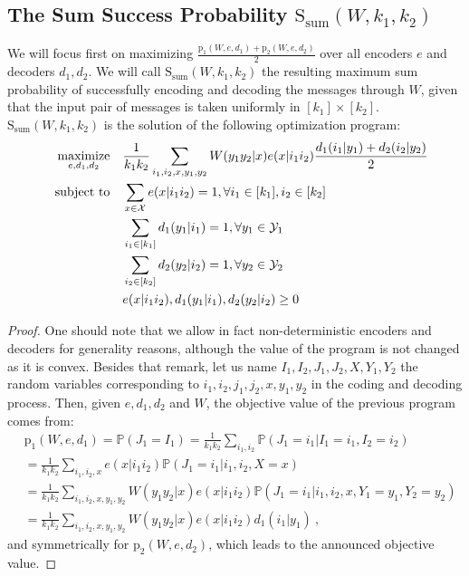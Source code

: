 \subsection{The Sum Success Probability $\mathrm{S}_{\text{sum}}(W,k_1,k_2)$}
We will focus first on maximizing $\frac{\mathrm{p}_1(W,e,d_1)+\mathrm{p}_2(W,e,d_2)}{2}$ over all encoders $e$ and decoders $d_1,d_2$. We will call $\mathrm{S}_{\text{sum}}(W,k_1,k_2)$ the resulting maximum sum probability of successfully encoding and decoding the messages through $W$, given that the input pair of messages is taken uniformly in $[k_1] \times [k_2]$. $\mathrm{S}_{\text{sum}}(W,k_1,k_2)$ is the solution of the following optimization program:
\begin{equation}
  \begin{aligned}
    &&\underset{e,d_1,d_2}{\operatorname{\text{maximize}}} &&& \frac{1}{k_1k_2}\sum_{i_1,i_2,x,y_1,y_2} W(y_1y_2|x)e(x|i_1i_2)\frac{d_1(i_1|y_1) + d_2(i_2|y_2)}{2}\\
    &&\operatorname{\text{subject to}} &&& \sum_{x \in \mathcal{X}} e(x|i_1i_2) = 1, \forall i_1 \in [k_1], i_2 \in [k_2]\\
    &&&&& \sum_{i_1 \in [k_1]} d_1(y_1|i_1) = 1, \forall y_1 \in \mathcal{Y}_1\\
    &&&&& \sum_{i_2 \in [k_2]} d_2(y_2|i_2) = 1, \forall y_2 \in \mathcal{Y}_2\\
    &&&&& e(x|i_1i_2), d_1(y_1|i_1), d_2(y_2|i_2) \geq 0
  \end{aligned}
\end{equation}

\begin{proof}
One should note that we allow in fact non-deterministic encoders and decoders for generality reasons, although the value of the program is not changed as it is convex. Besides that remark, let us name $I_1,I_2,J_1,J_2,X,Y_1,Y_2$ the random variables corresponding to $i_1,i_2,j_1,j_2,x,y_1,y_2$ in the coding and decoding process. Then, given $e,d_1,d_2$ and $W$, the objective value of the previous program comes from:
\begin{equation}
  \begin{aligned}
    &\mathrm{p}_1(W,e,d_1) = \mathbb{P}\left(J_1 = I_1\right) = \frac{1}{k_1k_2}\sum_{i_1,i_2} \mathbb{P}\left(J_1 = i_1|I_1=i_1,I_2=i_2\right)\\
    &= \frac{1}{k_1k_2}\sum_{i_1,i_2,x}e(x|i_1i_2) \mathbb{P}\left(J_1 = i_1|i_1,i_2,X=x\right)\\
    &= \frac{1}{k_1k_2}\sum_{i_1,i_2,x,y_1,y_2}W(y_1y_2|x)e(x|i_1i_2) \mathbb{P}\left(J_1 = i_1|i_1,i_2,x,Y_1=y_1,Y_2=y_2\right)\\
    &= \frac{1}{k_1k_2}\sum_{i_1,i_2,x,y_1,y_2}W(y_1y_2|x)e(x|i_1i_2)d_1(i_1|y_1) \ ,
  \end{aligned}
\end{equation}
and symmetrically for $\mathrm{p}_2(W,e,d_2)$, which leads to the announced objective value.
\end{proof}


